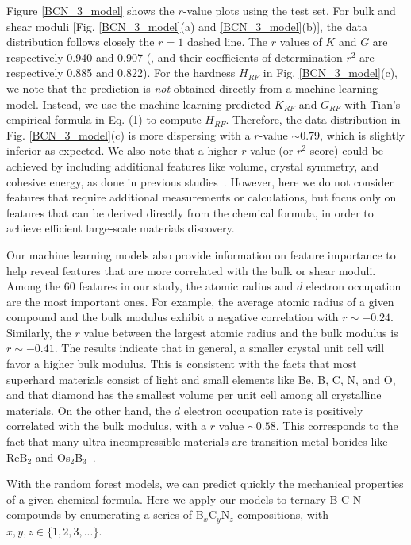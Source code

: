     \pagebreak	
	Figure \ref{BCN_3_model} shows the $r$-value plots using the test set. For bulk and shear moduli [Fig. \ref{BCN_3_model}(a) and \ref{BCN_3_model}(b)], the data distribution follows closely the $r=1$ dashed line. The $r$ values of $K$ and $G$ are respectively 0.940 and 0.907 (, and their coefficients of determination $r^2$ are respectively 0.885 and 0.822). For the hardness $H_{RF}$ in Fig. \ref{BCN_3_model}(c), we note that the prediction is {\it not} obtained directly from a machine learning model. Instead, we use the machine learning predicted $K_{RF}$ and $G_{RF}$ with Tian's empirical formula in Eq. (1) to compute $H_{RF}$. Therefore, the data distribution in Fig. \ref{BCN_3_model}(c) is more dispersing with a $r$-value $\sim 0.79$, which is slightly inferior as expected.
	We also note that a higher $r$-value (or $r^2$ score) could be achieved by including additional features like volume, crystal symmetry, and cohesive energy, as done in previous studies~\cite{furmanchuk2016predictive, de2016statistical, isayev2017universal, evans2017predicting,Mansouri2018, Avery2019}. However, here we do not consider features that require additional measurements or calculations, but focus only on features that can be derived directly from the chemical formula, in order to achieve efficient large-scale materials discovery.
	
	Our machine learning models also provide information on feature importance to help reveal features that are more correlated with the bulk or shear moduli. Among the 60 features in our study, the atomic radius and $d$ electron occupation are the most important ones. 
	For example, the average atomic radius of a given compound and the bulk modulus exhibit a negative correlation with $r \sim -0.24$.
	Similarly, the $r$ value between the largest atomic radius and the bulk modulus is $r \sim -0.41$.
	The results indicate that in general, a smaller crystal unit cell will favor a higher bulk modulus.
	This is consistent with the facts that most superhard materials consist of light and small elements like Be, B, C, N, and O, and that diamond has the smallest volume per unit cell among all crystalline materials.
	On the other hand, the $d$ electron occupation rate is positively correlated with the bulk modulus, with a $r$ value $\sim 0.58$.
	This corresponds to the fact that many ultra incompressible materials are transition-metal borides like ReB$_2$ and Os$_2$B$_3$~\cite{Burrage_2020_ReB2,Burrage_2020_Os2B3}.
	
	With the random forest models, we can predict quickly the mechanical properties of a given chemical formula. Here we apply our models to ternary B-C-N compounds by enumerating a series of B$_x$C$_y$N$_z$ compositions, with $x,y,z\in \{1,2,3,...\}$.
	    
